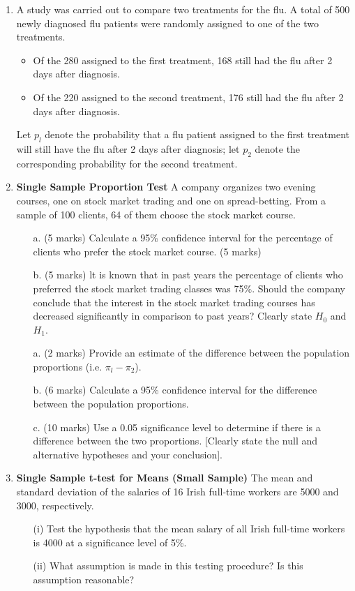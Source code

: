 \documentclass[]{report}
\begin{document}
\begin{enumerate}
	
	\item  %
	A study was carried out to compare two treatments for the flu. A total of 500
	newly diagnosed flu patients were randomly assigned to one of the two treatments.
	\begin{itemize}
		\item Of the 280 assigned to the first treatment, 168 still had the flu after 2 days after
		diagnosis. \item Of the 220 assigned to the second treatment, 176 still had the flu after 2
		days after diagnosis. \end{itemize} Let $p_l$ denote the probability that a flu patient assigned to the
	first treatment will still have the flu after 2 days after diagnosis; let $p_2$ denote the
	corresponding probability for the second treatment.
	
	\item 	\textbf{Single Sample Proportion Test } %
	A company organizes two evening courses, one on stock market trading and one on
	spread-betting. From a sample of 100 clients, 64 of them choose the stock market course.
	
	\begin{itemize}
		\item[a.](5 marks) Calculate a 95\% confidence interval for the percentage of clients who
		prefer the stock market course. (5 marks)
		\item[b.](5 marks) lt is known that in past years the percentage of clients who preferred the
		stock market trading classes was 75\%. Should the company conclude that
		the interest in the stock market trading courses has decreased significantly in
		comparison to past years? Clearly state $H_0$ and $H_1$.
	\end{itemize}
	
	\begin{itemize}
		\item[a.] (2 marks) Provide an estimate of the difference between the population
		proportions (i.e. $\pi_l -\pi_2$).
		\item[b.] (6 marks) Calculate a 95\% confidence interval for the difference between the
		population proportions.
		\item[c.] (10 marks) Use a 0.05 significance level to determine if there is a difference
		between the two proportions. [Clearly state the null and alternative hypotheses
		and your conclusion].
	\end{itemize}
	
	
	\item \textbf{Single Sample t-test for Means (Small Sample) } %
	The mean and standard deviation of the salaries of 16 Irish full-time workers are 5000 and
	3000, respectively.
	\begin{itemize}
		\item[(i)] Test the hypothesis that the mean salary of all Irish full-time workers is 4000 at a significance level of 5\%.
		\item[(ii)] What assumption is made in this testing procedure? Is this assumption reasonable?
	\end{itemize}
	
\end{enumerate}	
\end{document}
